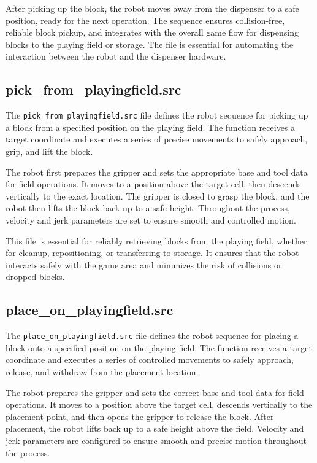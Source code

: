 \documentclass{article}
\begin{document}
            After picking up the block, the robot moves away from the dispenser to a safe position, ready for the next operation. The sequence ensures collision-free, reliable block pickup, and integrates with the overall game flow for dispensing blocks to the playing field or storage. The file is essential for automating the interaction between the robot and the dispenser hardware.

        \subsection{pick\_from\_playingfield.src}
            The \texttt{pick\_from\_playingfield.src} file defines the robot sequence for picking up a block from a specified position on the playing field. The function receives a target coordinate and executes a series of precise movements to safely approach, grip, and lift the block.

            The robot first prepares the gripper and sets the appropriate base and tool data for field operations. It moves to a position above the target cell, then descends vertically to the exact location. The gripper is closed to grasp the block, and the robot then lifts the block back up to a safe height. Throughout the process, velocity and jerk parameters are set to ensure smooth and controlled motion.

            This file is essential for reliably retrieving blocks from the playing field, whether for cleanup, repositioning, or transferring to storage. It ensures that the robot interacts safely with the game area and minimizes the risk of collisions or dropped blocks.

        \subsection{place\_on\_playingfield.src}
            The \texttt{place\_on\_playingfield.src} file defines the robot sequence for placing a block onto a specified position on the playing field. The function receives a target coordinate and executes a series of controlled movements to safely approach, release, and withdraw from the placement location.

            The robot prepares the gripper and sets the correct base and tool data for field operations. It moves to a position above the target cell, descends vertically to the placement point, and then opens the gripper to release the block. After placement, the robot lifts back up to a safe height above the field. Velocity and jerk parameters are configured to ensure smooth and precise motion throughout the process.
\end{document}
